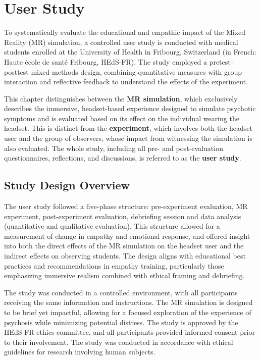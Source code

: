 \chapter{User Study}
\label{ch:userstudy}


To systematically evaluate the educational and empathic impact of the Mixed Reality (MR) simulation, a controlled user study is conducted with medical students enrolled at the University of Health in Fribourg, Switzerland (in French: Haute école de santé Fribourg, HEdS-FR). The study employed a pretest–posttest mixed-methods design, combining quantitative measures with group interaction and reflective feedback to understand the effects of the experiment.

\vspace{1em}

This chapter distinguishes between the \textbf{MR simulation}, which exclusively describes the immersive, headset-based experience designed to simulate psychotic symptoms and is evaluated based on its effect on the individual wearing the headset. This is distinct from the \textbf{experiment}, which involves both the headset user  and the group of observers, whose impact from witnessing the simulation is also evaluated. The whole study, including all pre- and post-evaluation questionnaires, reflections, and discussions, is referred to as the \textbf{user study}.

\section{Study Design Overview}

The user study followed a five-phase structure: pre-experiment evaluation, MR experiment, post-experiment evaluation, debriefing session and data analysis (quantitative and qualitative evaluation). This structure allowed for a measurement of change in empathy and emotional response, and offered insight into both the direct effects of the MR simulation on the headset user and the indirect effects on observing students. The design aligns with educational best practices and recommendations in empathy training, particularly those emphasizing immersive realism combined with ethical framing and debriefing.


\vspace{1em}
The study was conducted in a controlled environment, with all participants receiving the same information and instructions. The MR simulation is designed to be brief yet impactful, allowing for a focused exploration of the experience of psychosis while minimizing potential distress.
The study is approved by the HEdS-FR ethics committee, and all participants provided informed consent prior to their involvement. The study was conducted in accordance with ethical guidelines for research involving human subjects.

